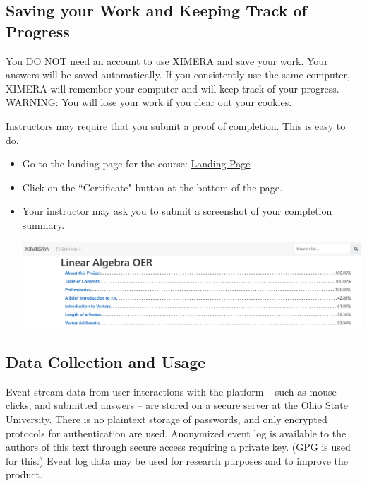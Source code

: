 \documentclass{ximera}
\begin{document}
\subsection*{Saving your Work and Keeping Track of Progress}
You DO NOT need an account to use XIMERA and save your work.
Your answers will be saved automatically.  If you consistently use the same computer, XIMERA will remember your computer and will keep track of your progress.   WARNING: You will lose your work if you clear out your cookies.

Instructors may require that you submit a proof of completion.  This is easy to do. 
\begin{itemize}
    \item Go to the landing page for the course: \href{https://ximera.osu.edu/qcstats/QC_stats}{Landing Page}
    
\item Click on the ``Certificate" button at the bottom of the page.

\item
Your instructor may ask you to submit a screenshot of your completion summary.
\begin{image}
\includegraphics{ximeraScreenshot3.jpg}
\end{image}
\end{itemize}
\subsection*{Data Collection and Usage}
Event stream data from user interactions with the platform -- such as mouse clicks, and submitted answers -- are stored on a secure server at the Ohio State University.  There is no plaintext storage of passwords, and only encrypted protocols for authentication are used.  Anonymized event log is available to the authors of this text through secure access requiring a private key. (GPG is used for this.)   Event log data may be used for research purposes and to improve the product.
\end{document}
